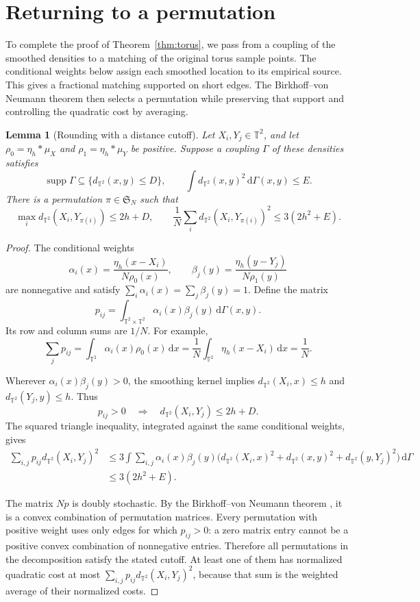 \documentclass[11pt]{article}
\newcommand{\T}{\mathbb T^2}
\newcommand{\supp}{\operatorname{supp}}
\newtheorem{lemma}[theorem]{Lemma}
\theoremstyle{remark}
\numberwithin{equation}{section}
\begin{document}
\section{Returning to a permutation}
\label{sec:rounding}

To complete the proof of Theorem~\ref{thm:torus}, we pass from a
coupling of the smoothed densities to a matching of the original torus
sample points. The conditional weights below assign each
smoothed location to its empirical source. This gives a fractional
matching supported on short edges. The Birkhoff--von Neumann theorem
then selects a permutation while preserving that support and controlling
the quadratic cost by averaging.

\begin{lemma}[Rounding with a distance cutoff]
\label{lem:rounding}
Let \(X_i,Y_j\in\T\), and let
\(\rho_0=\eta_h*\mu_X\) and \(\rho_1=\eta_h*\mu_Y\) be positive.
Suppose a coupling \(\Gamma\) of these densities satisfies
\[
 \supp\Gamma\subseteq\{d_{\T}(x,y)\le D\},
 \qquad
 \int d_{\T}(x,y)^2\,\mathrm d\Gamma(x,y)\le E.
\]
There is a permutation \(\pi\in\mathfrak S_N\) such that
\[
 \max_i d_{\T}(X_i,Y_{\pi(i)})\le2h+D,\qquad
 \frac1N\sum_i d_{\T}(X_i,Y_{\pi(i)})^2
 \le3(2h^2+E).
\]
\end{lemma}

\begin{proof}
The conditional weights
\[
 \alpha_i(x)=\frac{\eta_h(x-X_i)}{N\rho_0(x)},
 \qquad
 \beta_j(y)=\frac{\eta_h(y-Y_j)}{N\rho_1(y)}
\]
are nonnegative and satisfy
\(\sum_i\alpha_i(x)=\sum_j\beta_j(y)=1\).
Define the matrix
\[
 p_{ij}=\int_{\T\times\T}
 \alpha_i(x)\beta_j(y)\,\mathrm d\Gamma(x,y).
\]
Its row and column sums are \(1/N\). For example,
\[
 \sum_jp_{ij}=\int_{\T}\alpha_i(x)\rho_0(x)\,\mathrm dx
 =\frac1N\int_{\T}\eta_h(x-X_i)\,\mathrm dx=\frac1N.
\]

Wherever \(\alpha_i(x)\beta_j(y)>0\), the smoothing kernel implies
\(d_{\T}(X_i,x)\le h\) and \(d_{\T}(Y_j,y)\le h\). Thus
\[
 p_{ij}>0\quad\Longrightarrow\quad
 d_{\T}(X_i,Y_j)\le2h+D.
\]
The squared triangle inequality, integrated against the same
conditional weights, gives
\begin{align*}
 \sum_{i,j}p_{ij}d_{\T}(X_i,Y_j)^2
 &\le3\int\sum_{i,j}\alpha_i(x)\beta_j(y)
 \bigl(d_{\T}(X_i,x)^2+d_{\T}(x,y)^2
       +d_{\T}(y,Y_j)^2\bigr)\,\mathrm d\Gamma\\
 &\le3(2h^2+E).
\end{align*}

The matrix \(Np\) is doubly stochastic. By the
Birkhoff--von Neumann theorem \cite{Bir46}, it is a convex combination
of permutation matrices. Every permutation with positive weight uses
only edges for which \(p_{ij}>0\): a zero matrix entry cannot be a
positive convex combination of nonnegative entries. Therefore all
permutations in the decomposition satisfy the stated cutoff.
At least one of them has normalized quadratic cost at most
\(\sum_{i,j}p_{ij}d_{\T}(X_i,Y_j)^2\), because that sum is the
weighted average of their normalized costs.
\end{proof}
\end{document}
